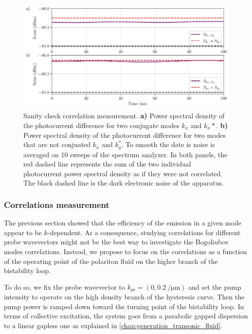 \begin{figure}
    \centering
    \includegraphics[width=1\textwidth]{chap_correlation/fig/noise_comparison.pdf}
    \caption{Sanity check correlation measurement. \textbf{a)} Power spectral density of the photocurrent difference for two conjugate modes $k_x$ and $k_x*$. \textbf{b)} Power spectral density of the photocurrent difference for two modes that are not conjuated $k_x$ and $k_y^*$. To smooth 
    the date is noise is averaged on 10 sweeps of the spectrum analyzer. In both panels, the red dashed line represents the sum of the two individual photocurrent power spectral density as if they were not correlated. The black dashed line is the dark electronic noise of the apparatus.} 
    \label{fig:noise_comparison}
\end{figure}



\subsubsection{Correlations measurement}
\label{sec:exp_corr_measurement}

The previous section showed that the efficiency of the emission in a given mode appear to be $k$-dependent. As a consequence, studying correlations for different probe wavevectors might not be the best way to investigate the Bogoliubov modes correlations.
Instead, we propose to focus on the correlations as a function of the operating point of the polariton fluid on the higher branch of the bistability loop. 

To do so, we fix the probe wavevector to $k_{pr}=(0,\SI{0.2}{\per\micro\meter})$ and set the pump intensity to operate on the high density branch of the hysteresis curve. Then the pump power is ramped down toward the turning point of the bistability loop.
In terms of collective excitation, the system goes from a parabolic gapped dispersion to a linear gapless one as explained in \autoref{chap:generation_transonic_fluid}.


